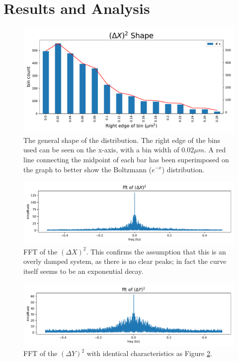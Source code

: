\documentclass[12pt]{article}
\begin{document}
\section{Results and Analysis}

\begin{figure}
\centering
    \includegraphics[scale=0.5]{primative_plot.pdf}
	\caption{The general shape of the distribution. The right edge of the bins used can be seen on the x-axis, with a bin width of $0.02 \mu m$. A red line connecting the midpoint of each bar has been superimposed on the graph to better show the Boltzmann ($e^{-x}$) distribution.}
    \label{fig:pri_plt}
\end{figure} %

\begin{figure}
\centering
    \includegraphics[width=\textwidth]{delta_x_fft.pdf}
	\caption{FFT of the $(\Delta X)^2$. This confirms the assumption that this is an overly damped system, as there is no clear peaks; in fact the curve itself seems to be an exponential decay.}
    \label{fig:delta_x_fft}
\end{figure} %

\begin{figure}
\centering
    \includegraphics[width=\textwidth]{delta_y_fft.pdf}
	\caption{FFT of the $(\Delta Y)^2$ with identical characteristics as Figure \ref{fig:delta_x_fft}.}	
    \label{fig:delta_y_fft}
\end{figure} %
\end{document}
